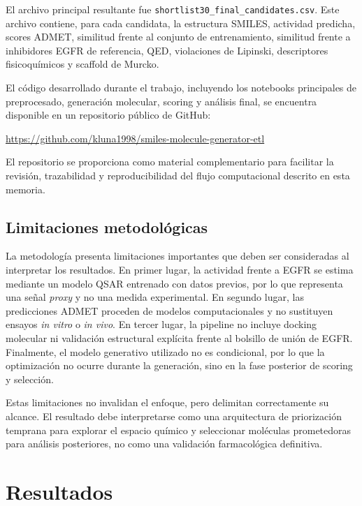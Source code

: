 \documentclass[IB]{TFUOC}%
\begin{document}
El archivo principal resultante fue \texttt{shortlist30\_final\_candidates.csv}. Este archivo contiene, para cada candidata, la estructura SMILES, actividad predicha, scores ADMET, similitud frente al conjunto de entrenamiento, similitud frente a inhibidores EGFR de referencia, QED, violaciones de Lipinski, descriptores fisicoquímicos y scaffold de Murcko.

El código desarrollado durante el trabajo, incluyendo los notebooks principales de preprocesado, generación molecular, scoring y análisis final, se encuentra disponible en un repositorio público de GitHub:

\vspace{0.1cm}
\begin{center}
\url{https://github.com/kluna1998/smiles-molecule-generator-etl}
\end{center}
\vspace{0.1cm}

El repositorio se proporciona como material complementario para facilitar la revisión, trazabilidad y reproducibilidad del flujo computacional descrito en esta memoria.

\section{Limitaciones metodológicas}

La metodología presenta limitaciones importantes que deben ser consideradas al interpretar los resultados. En primer lugar, la actividad frente a EGFR se estima mediante un modelo QSAR entrenado con datos previos, por lo que representa una señal \textit{proxy} y no una medida experimental. En segundo lugar, las predicciones ADMET proceden de modelos computacionales y no sustituyen ensayos \textit{in vitro} o \textit{in vivo}. En tercer lugar, la pipeline no incluye docking molecular ni validación estructural explícita frente al bolsillo de unión de EGFR. Finalmente, el modelo generativo utilizado no es condicional, por lo que la optimización no ocurre durante la generación, sino en la fase posterior de scoring y selección.

Estas limitaciones no invalidan el enfoque, pero delimitan correctamente su alcance. El resultado debe interpretarse como una arquitectura de priorización temprana para explorar el espacio químico y seleccionar moléculas prometedoras para análisis posteriores, no como una validación farmacológica definitiva.


\chapter{Resultados}
\label{chap:resultados}
\end{document}
